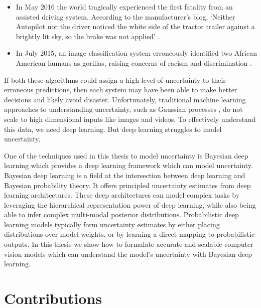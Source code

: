 \begin{itemize}
\item In May 2016 the world tragically experienced the first fatality from an assisted driving system. According to the manufacturer's blog, `Neither Autopilot nor the driver noticed the white side of the tractor trailer against a brightly lit sky, so the brake was not applied' \citep{teslaCrashReport}.
\item In July 2015, an image classification system erroneously identified two African American humans as gorillas, raising concerns of racism and discrimination \citep{googleblackgorilla}.
\end{itemize}

If both these algorithms could assign a high level of uncertainty to their erroneous predictions, then each system may have been able to make better decisions and likely avoid disaster. Unfortunately, traditional machine learning approaches to understanding uncertainty, such as Gaussian processes \citep{rasmussen2006gaussian}, do not scale to high dimensional inputs like images and videos. 
To effectively understand this data, we need deep learning. But deep learning struggles to model uncertainty.

One of the techniques used in this thesis to model uncertainty is Bayesian deep learning \citep{mackay1992practical} which provides a deep learning framework which can model uncertainty.
Bayesian deep learning is a field at the intersection between deep learning and Bayesian probability theory.
It offers principled uncertainty estimates from deep learning architectures.
These deep architectures can model complex tasks by leveraging the hierarchical representation power of deep learning, while also being able to infer complex multi-modal posterior distributions.
Probabilistic deep learning models typically form uncertainty estimates by either placing distributions over model weights, or by learning a direct mapping to probabilistic outputs. In this thesis we show how to formulate accurate and scalable computer vision models which can understand the model's uncertainty with Bayesian deep learning.

\section{Contributions}

